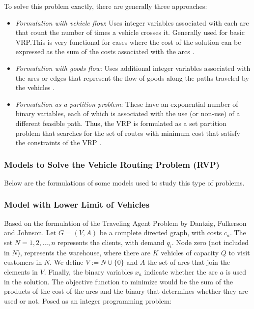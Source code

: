 \documentclass{amsart}
\begin{document}
            To solve this problem exactly, there are generally three approaches:
            \begin{itemize}
                \item \textit{Formulation with vehicle flow}: Uses integer variables associated with each arc that count the number of times a vehicle crosses it. Generally used for basic VRP.\@ This is very functional for cases where the cost of the solution can be expressed as the sum of the costs associated with the arcs \parencite{Toth2002}.
                \item \textit{Formulation with goods flow}: Uses additional integer variables associated with the arcs or edges that represent the flow of goods along the paths traveled by the vehicles \parencite{Toth2002}.
                \item \textit{Formulation as a partition problem}: These have an exponential number of binary variables, each of which is associated with the use (or non-use) of a different feasible path. Thus, the VRP is formulated as a set partition problem that searches for the set of routes with minimum cost that satisfy the constraints of the VRP \parencite{Toth2002}.
            \end{itemize}

            \subsubsection{Models to Solve the Vehicle Routing Problem (RVP)}
             Below are the formulations of some models used to study this type of problems.

            \subsubsection*{Model with Lower Limit of Vehicles \parencite{Larraín2021, Toth2002}}
             Based on the formulation of the Traveling Agent Problem by Dantzig, Fulkerson and Johnson. Let $G=(V, A)$ be a complete directed graph, with costs $c_a$. The set $N={1, 2, \ldots , n}$ represents the clients, with demand $q_i$. Node zero (not included in $N$), represents the warehouse, where there are $K$ vehicles of capacity $Q$ to visit customers in $N$. We define $V:=N \cup \{0\}$ and $A$ the set of arcs that join the elements in $V$. Finally, the binary variables $x_a$ indicate whether the arc $a$ is used in the solution. The objective function to minimize would be the sum of the products of the cost of the arcs and the binary that determines whether they are used or not. Posed as an integer programming problem:
            
\end{document}
